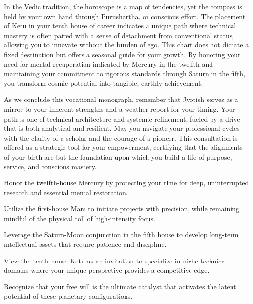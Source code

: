 {\fontsize{9}{13}\selectfont In the Vedic tradition, the horoscope is a map of tendencies, yet the compass is held by your own hand through Purushartha, or conscious effort. The placement of Ketu in your tenth house of career indicates a unique path where technical mastery is often paired with a sense of detachment from conventional status, allowing you to innovate without the burden of ego. This chart does not dictate a fixed destination but offers a seasonal guide for your growth. By honoring your need for mental recuperation indicated by Mercury in the twelfth and maintaining your commitment to rigorous standards through Saturn in the fifth, you transform cosmic potential into tangible, earthly achievement.}\par\vspace{1.8mm}

{\fontsize{9}{13}\selectfont As we conclude this vocational monograph, remember that Jyotish serves as a mirror to your inherent strengths and a weather report for your timing. Your path is one of technical architecture and systemic refinement, fueled by a drive that is both analytical and resilient. May you navigate your professional cycles with the clarity of a scholar and the courage of a pioneer. This consultation is offered as a strategic tool for your empowerment, certifying that the alignments of your birth are but the foundation upon which you build a life of purpose, service, and conscious mastery.}\par\vspace{1.8mm}

\begin{diamondlist}
  \item {\fontsize{8.5}{12}\selectfont Honor the twelfth-house Mercury by protecting your time for deep, uninterrupted research and essential mental restoration.}
  \item {\fontsize{8.5}{12}\selectfont Utilize the first-house Mars to initiate projects with precision, while remaining mindful of the physical toll of high-intensity focus.}
  \item {\fontsize{8.5}{12}\selectfont Leverage the Saturn-Moon conjunction in the fifth house to develop long-term intellectual assets that require patience and discipline.}
  \item {\fontsize{8.5}{12}\selectfont View the tenth-house Ketu as an invitation to specialize in niche technical domains where your unique perspective provides a competitive edge.}
  \item {\fontsize{8.5}{12}\selectfont Recognize that your free will is the ultimate catalyst that activates the latent potential of these planetary configurations.}
\end{diamondlist}


